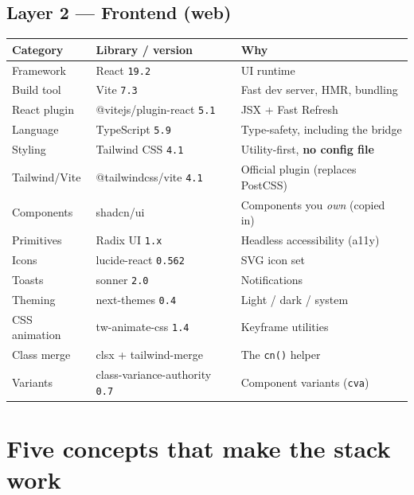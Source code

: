 \documentclass[11pt,a4paper]{article}
\begin{document}
\subsection{Layer 2 --- Frontend (web)}
\begin{center}
\begin{tabularx}{\linewidth}{@{}l l X@{}}
\toprule
\textbf{Category} & \textbf{Library / version} & \textbf{Why} \\
\midrule
Framework      & React \texttt{19.2}                 & UI runtime \\
Build tool     & Vite \texttt{7.3}                   & Fast dev server, HMR, bundling \\
React plugin   & @vitejs/plugin-react \texttt{5.1}   & JSX + Fast Refresh \\
Language       & TypeScript \texttt{5.9}             & Type-safety, including the bridge \\
Styling        & Tailwind CSS \texttt{4.1}           & Utility-first, \textbf{no config file} \\
Tailwind/Vite  & @tailwindcss/vite \texttt{4.1}      & Official plugin (replaces PostCSS) \\
Components     & shadcn/ui                            & Components you \emph{own} (copied in) \\
Primitives     & Radix UI \texttt{1.x}               & Headless accessibility (a11y) \\
Icons          & lucide-react \texttt{0.562}         & SVG icon set \\
Toasts         & sonner \texttt{2.0}                 & Notifications \\
Theming        & next-themes \texttt{0.4}            & Light / dark / system \\
CSS animation  & tw-animate-css \texttt{1.4}         & Keyframe utilities \\
Class merge    & clsx + tailwind-merge               & The \texttt{cn()} helper \\
Variants       & class-variance-authority \texttt{0.7} & Component variants (\texttt{cva}) \\
\bottomrule
\end{tabularx}
\end{center}

\section{Five concepts that make the stack work}
\end{document}
